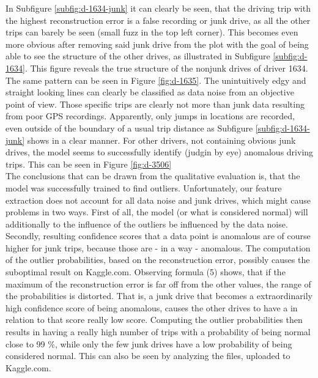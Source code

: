 \documentclass{vldb}
\begin{document}
In Subfigure \ref{subfig:d-1634-junk}  it can clearly be seen, that the driving trip with the highest reconstruction error is a false recording or junk drive, as all the other trips can barely be seen (small fuzz in the top left corner). This becomes even more obvious after removing said junk drive from the plot with the goal of being able to see the structure of the other drives, as illustrated in Subfigure \ref{subfig:d-1634}. This figure reveals the true structure of the nonjunk drives of driver 1634. The same pattern can be seen in Figure \ref{fig:d-1635}. The unintuitively edgy and straight looking lines can clearly be classified as data noise from an objective point of view. Those specific trips are clearly not more than junk data resulting from poor GPS recordings. Apparently, only jumps in locations are recorded, even outside of the boundary of a usual trip distance as Subfigure \ref{subfig:d-1634-junk} shows in a clear manner. For other drivers, not containing obvious junk drives, the model seems to successfully identify (judgin by eye) anomalous driving trips. This can be seen in Figure \ref{fig:d-3506}\\
The conclusions that can be drawn from the qualitative evaluation is, that the model was successfully trained to find outliers. Unfortunately, our feature extraction does not account for all data noise and junk drives, which might cause problems in two ways. First of all, the model (or what is considered normal) will additionally to the influence of the outliers be influenced by the data noise. Secondly, resulting confidence scores that a data point is anomalous are of course higher for junk trips, because those are - in a way - anomalous. The computation of the outlier probabilities, based on the reconstruction error, possibly causes the suboptimal result on Kaggle.com. Observing formula (5) shows, that if the maximum of the reconstruction error is far off from the other values, the range of the probabilities is distorted. That is, a junk drive that becomes a extraordinarily high confidence score of being anomalous, causes the other drives to have a in relation to that score really low score. Computing the outlier probabilities then results in having a really high number of trips with a probability of being normal close to 99 \%, while only the few junk drives have a low probability of being considered normal.
This can also be seen by analyzing the files, uploaded to Kaggle.com.
\end{document}
